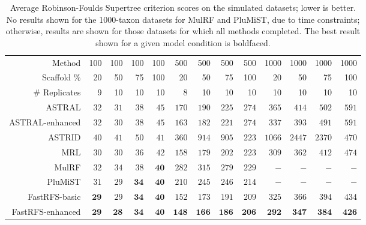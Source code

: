 \begin{table}
\centering
\begin{tabular}{|r|rrrr|rrrr|rrrr|}
\hline
Method&100 & 100 & 100 & 100 & 500 & 500 & 500 & 500 & 1000 & 1000 & 1000 & 1000\\
Scaffold \% &20 & 50 & 75 & 100 & 20 & 50 & 75 & 100 & 20 & 50 & 75 & 100\\
\# Replicates & 9 & 10 & 10 & 10 & 8 & 10 & 10 & 10 & 10 & 10 & 10 & 10 \\
\hline 
\hline
ASTRAL&	$32$&	$31$&	$38$&	$45$&	$170$&	$190$&	$225$&	$274$&	$365$&	$414$&	$502$&	$591$\\
ASTRAL-enhanced&	$32$&	$30$&	$38$&	$45$&	$163$&	$182$&	$221$&	$274$&	$337$&	$393$&	$491$&	$591$\\
ASTRID&	$40$&	$41$&	$50$&	$41$&	$360$&	$914$&	$905$&	$223$&	$1066$&	$2447$&	$2370$&	$470$\\
MRL&	$30$&	$30$&	$36$&	$42$&	$158$&	$179$&	$202$&	$223$&	$309$&	$362$&	$412$&	$474$\\
MulRF&	$32$&	$34$&	$38$&	$\mathbf{40}$&	$282$&	$315$&	$279$&	$229$&	$-$&	$-$&	$-$&	$-$\\
PluMiST&	$31$&	$29$&	$\mathbf{34}$&	$\mathbf{40}$&	$210$&	$245$&	$246$&	$214$&	$-$&	$-$&	$-$&	$-$\\
\hline
FastRFS-basic&	$\mathbf{29}$&	$29$&	$\mathbf{34}$&	$\mathbf{40}$&	$152$&	$173$&	$191$&	$209$&	$325$&	$366$&	$394$&	$434$\\
FastRFS-enhanced&	$\mathbf{29}$&	$\mathbf{28}$&	$\mathbf{34}$&	$\mathbf{40}$&	$\mathbf{148}$&	$\mathbf{166}$&	$\mathbf{186}$&	$\mathbf{206}$&	$\mathbf{292}$&	$\mathbf{347}$&	$\mathbf{384}$&	$\mathbf{426}$\\
\hline
\end{tabular}
\caption[RFS criterion scores on simulated datasets for FastRFS and other methods]{Average Robinson-Foulds Supertree criterion scores on the
simulated datasets; lower is better.
No results shown for the 1000-taxon 
datasets for MulRF and PluMiST, due to time constraints; otherwise,
results are shown for those datasets for which all methods completed.
The best result shown  for a given model condition
is boldfaced.
}
\label{fastrfs::table:simulated-critscores}
\end{table}





